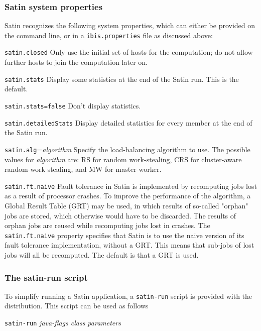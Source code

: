 \documentclass[a4paper,10pt]{article}
\begin{document}
\subsubsection{Satin system properties}

Satin recognizes the following system properties, which can either
be provided on the command line, or in a \texttt{ibis.properties} file
as discussed above:
\begin{description}
\item{\texttt{satin.closed}}
Only use the initial set of hosts for the computation; do not allow
further hosts to join the computation later on.
\item{\texttt{satin.stats}}
Display some statistics at the end of the Satin run. This is the default.
\item{\texttt{satin.stats=false}}
Don't display statistics.
\item{\texttt{satin.detailedStats}}
Display detailed statistics for every member at the end of the Satin run.
\item{\texttt{satin.alg}=\emph{algorithm}}
Specify the load-balancing algorithm to use. The possible values for
\emph{algorithm} are: RS for random work-stealing, CRS for cluster-aware
random-work stealing, and MW for master-worker.
\item{\texttt{satin.ft.naive}}
Fault tolerance in Satin is implemented by recomputing jobs lost as a
result of processor crashes.
To improve the performance of the
algorithm, a Global Result Table (GRT) may be used, in which results of
so-called "orphan" jobs are stored, which otherwise would have to be discarded.
The results of orphan jobs are reused while recomputing jobs lost in
crashes. The \texttt{satin.ft.naive} property specifies that Satin is
to use the naive version of its fault tolerance implementation, without
a GRT. This means that sub-jobs of lost jobs will all be recomputed.
The default is that a GRT is used.
\end{description}

\subsubsection{The satin-run script}

To simplify running a Satin application, a \texttt{satin-run} script is
provided with the distribution. This script can be
used as follows

\begin{center}
\texttt{satin-run} \emph{java-flags class parameters}
\end{center}
\end{document}
